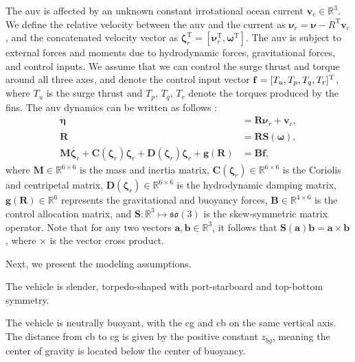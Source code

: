 The \gls{auv} is affected by an unknown constant irrotational ocean current $\mathbf{v}_c\in\mathbb{R}^3$. We define the relative velocity between the \gls{auv} and the current as $\bm{\nu}_r = \bm{\nu} - R^\mathrm{T}\mathbf{v}_c$, and the concatenated velocity vector as $\bm{\zeta}_r^\mathrm{T} = [\bm{\nu}_r^\mathrm{T},\bm{\omega}^\mathrm{T}]$. The \gls{auv} is subject to external forces and moments due to hydrodynamic forces, gravitational forces, and control inputs. We assume that we can control the surge thrust and torque around all three axes, and denote the control input vector $\mathbf{f} = [T_u,T_p,T_q,T_r]^{\rm T}$, where $T_u$ is the surge thrust and $T_p,\, T_q, \, T_r$ denote the torques produced by the fins. The \gls{auv} dynamics can be written as follows \citep{fossen_handbook_2021}:
\begin{subequations}\label{eq:auv_model}
\begin{align}
\dot{\bm{\eta}} &= \mathbf{R}\bm{\nu}_r + \mathbf{v}_c, \\
\dot{\mathbf{R}} &= \mathbf{R} \mathbf{S}(\bm{\omega}), \\
\mathbf{M}\dot{\bm{\zeta}_r} + \mathbf{C}(\bm{\zeta}_r)\bm{\zeta}_r + \mathbf{D}(\bm{\zeta}_r)\bm{\zeta}_r + \mathbf{g}(\mathbf{R}) &= \mathbf{Bf},\label{eq:auv_model_c}
\end{align}
\end{subequations}
where $\mathbf{M}\in\mathbb{R}^{6\times 6}$ is the mass and inertia matrix, $\mathbf{C}(\bm{\zeta}_r)\in\mathbb{R}^{6\times 6}$ is the Coriolis and centripetal matrix, $\mathbf{D}(\bm{\zeta}_r)\in\mathbb{R}^{6\times 6}$ is the hydrodynamic damping matrix, $\mathbf{g}(\mathbf{R})\in\mathbb{R}^6$ represents the gravitational and buoyancy forces, $\mathbf{B}\in\mathbb{R}^{4\times 6}$ is the control allocation matrix, %
and $\mathbf{S} : \mathbb{R}^3 \mapsto \mathfrak{so}(3)$ is the skew-symmetric matrix operator. Note that for any two vectors $\mathbf{a}, \mathbf{b} \in \mathbb{R}^3$, it follows that $\mathbf{S}(\mathbf{a})\mathbf{b} = \mathbf{a} \times \mathbf{b}$, where $\times$ is the vector cross product.

Next, we present the modeling assumptions.
\begin{assumption}\label{assumption:one}
The vehicle is slender, torpedo-shaped with port-starboard and top-bottom symmetry.
\end{assumption}
\begin{assumption}\label{assumption:two}
    The vehicle is neutrally buoyant, with the \gls{cg} and \gls{cb} on the same vertical axis. The distance from \gls{cb} to \gls{cg} is given by the positive constant $z_{bg}$, meaning the center of gravity is located below the center of buoyancy.
\end{assumption}


